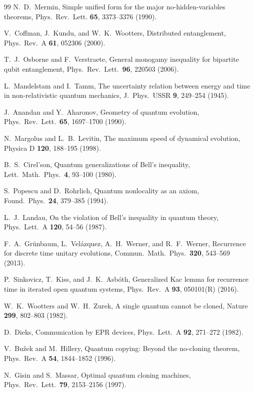 \documentclass[aps,pra,onecolumn,superscriptaddress,nofootinbib,10pt]{revtex4-2}
\theoremstyle{definition}
\theoremstyle{remark}
\begin{document}
\begin{thebibliography}{99}
 N.~D.~Mermin, Simple unified form for the major no-hidden-variables theorems, Phys.\ Rev.\ Lett. \textbf{65}, 3373--3376 (1990).

 V.~Coffman, J.~Kundu, and W.~K.~Wootters, Distributed entanglement, Phys.\ Rev.\ A \textbf{61}, 052306 (2000).

 T.~J.~Osborne and F.~Verstraete, General monogamy inequality for bipartite qubit entanglement, Phys.\ Rev.\ Lett.\ \textbf{96}, 220503 (2006).

 L.~Mandelstam and I.~Tamm, The uncertainty relation between energy and time in non-relativistic quantum mechanics, J.\ Phys.\ USSR \textbf{9}, 249--254 (1945).

 J.~Anandan and Y.~Aharonov, Geometry of quantum evolution, Phys.\ Rev.\ Lett.\ \textbf{65}, 1697--1700 (1990).

 N.~Margolus and L.~B.~Levitin, The maximum speed of dynamical evolution, Physica D \textbf{120}, 188--195 (1998).

 B.~S.~Cirel'son, Quantum generalizations of Bell's inequality, Lett.\ Math.\ Phys.\ \textbf{4}, 93--100 (1980).

 S.~Popescu and D.~Rohrlich, Quantum nonlocality as an axiom, Found.\ Phys.\ \textbf{24}, 379--385 (1994).

 L.~J.~Landau, On the violation of Bell's inequality in quantum theory, Phys.\ Lett.\ A \textbf{120}, 54--56 (1987).

 F.~A.~Gr\"unbaum, L.~Vel\'azquez, A.~H.~Werner, and R.~F.~Werner, Recurrence for discrete time unitary evolutions, Commun.\ Math.\ Phys.\ \textbf{320}, 543--569 (2013).

 P.~Sinkovicz, T.~Kiss, and J.~K.~Asb\'oth, Generalized Kac lemma for recurrence time in iterated open quantum systems, Phys.\ Rev.\ A \textbf{93}, 050101(R) (2016).

 W.~K.~Wootters and W.~H.~Zurek, A single quantum cannot be cloned, Nature \textbf{299}, 802--803 (1982).

 D.~Dieks, Communication by EPR devices, Phys.\ Lett.\ A \textbf{92}, 271--272 (1982).

 V.~Bu\v zek and M.~Hillery, Quantum copying: Beyond the no-cloning theorem, Phys.\ Rev.\ A \textbf{54}, 1844--1852 (1996).

 N.~Gisin and S.~Massar, Optimal quantum cloning machines, Phys.\ Rev.\ Lett.\ \textbf{79}, 2153--2156 (1997).


\end{thebibliography}
\end{document}
